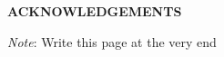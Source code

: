 \begin{centering}
\textbf{ACKNOWLEDGEMENTS}\\
\vspace{\baselineskip}
\end{centering}

\emph{Note}: Write this page at the very end

